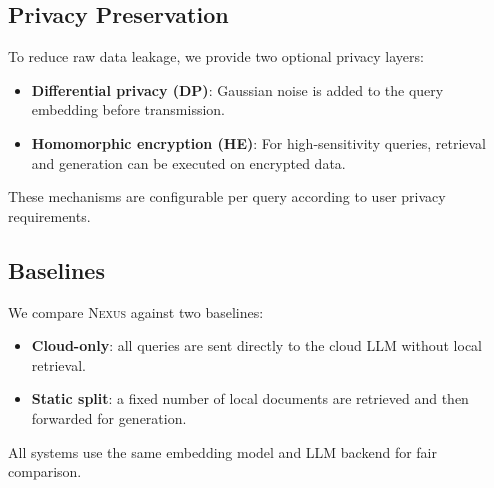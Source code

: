 \subsection{Privacy Preservation}
To reduce raw data leakage, we provide two optional privacy layers:
\begin{itemize}
    \item \textbf{Differential privacy (DP)}: Gaussian noise is added to the query embedding before transmission.
    \item \textbf{Homomorphic encryption (HE)}: For high-sensitivity queries, retrieval and generation can be executed on encrypted data.
\end{itemize}
These mechanisms are configurable per query according to user privacy requirements.

\subsection{Baselines}
We compare \textsc{Nexus} against two baselines:
\begin{itemize}
    \item \textbf{Cloud-only}: all queries are sent directly to the cloud LLM without local retrieval.
    \item \textbf{Static split}: a fixed number of local documents are retrieved and then forwarded for generation.
\end{itemize}
All systems use the same embedding model and LLM backend for fair comparison.
